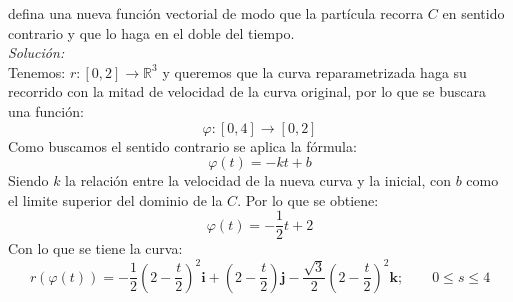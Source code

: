 \documentclass[12pt]{article}
\begin{document}
defina una nueva función vectorial de modo que la partícula recorra $C$ en sentido
contrario y que lo haga en el doble del tiempo.\\
\emph{Solución:}\\
Tenemos: $r:[0,2]\to\mathds{R}^3$ y queremos que la curva reparametrizada haga su recorrido con la mitad de velocidad de la curva original, por lo que se buscara una función:
\[\varphi:[0,4]\to[0,2]\]
Como buscamos el sentido contrario se aplica la fórmula:
\[\varphi(t)=-kt+b \]
Siendo $k$ la relación entre la velocidad de la nueva curva y la inicial, con $b$ como el limite superior del dominio de la $C$. Por lo que se obtiene:
\[\varphi(t)=-\dfrac{1}{2}t+2 \]
Con lo que se tiene la curva:
\[r(\varphi(t))=-\dfrac{1}{2}\left(2-\dfrac{t}{2}\right)^2\mathbf{i}+\left(2-\dfrac{t}{2}\right)\mathbf{j}-\dfrac{\sqrt{3}}{2}\left(2-\dfrac{t}{2}\right)^2\mathbf{k}; \qquad 0\leq s\leq4 \]



\end{document}
